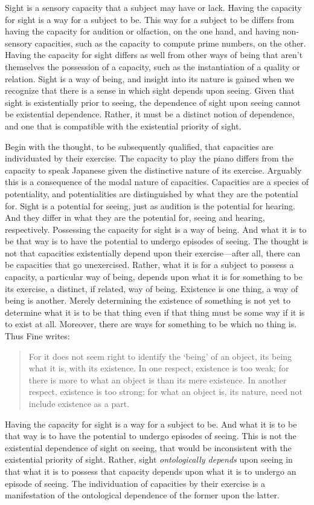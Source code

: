 \documentclass[12pt]{article}
\begin{document}
Sight is a sensory capacity that a subject may have or lack. Having the capacity for sight is a way for a subject to be. This way for a subject to be differs from having the capacity for audition or olfaction, on the one hand, and having non-sensory capacities, such as the capacity to compute prime numbers, on the other. Having the capacity for sight differs as well from other ways of being that aren't themselves the possession of a capacity, such as the instantiation of a quality or relation. Sight is a way of being, and insight into its nature is gained when we recognize that there is a sense in which sight depends upon seeing. Given that sight is existentially prior to seeing, the dependence of sight upon seeing cannot be existential dependence. Rather, it must be a distinct notion of dependence, and one that is compatible with the existential priority of sight.

Begin with the thought, to be subsequently qualified, that capacities are individuated by their exercise. The capacity to play the piano differs from the capacity to speak Japanese given the distinctive nature of its exercise. Arguably this is a consequence of the modal nature of capacities. Capacities are a species of potentiality, and potentialities are distinguished by what they are the potential for. Sight is a potential for seeing, just as audition is the potential for hearing. And they differ in what they are the potential for, seeing and hearing, respectively. Possessing the capacity for sight is a way of being. And what it is to be that way is to have the potential to undergo episodes of seeing. The thought is not that capacities existentially depend upon their exercise---after all, there can be capacities that go unexercised. Rather, what it is for a subject to possess a capacity, a particular way of being, depends upon what it is for something to be its exercise, a distinct, if related, way of being. Existence is one thing, a way of being is another. Merely determining the existence of something is not yet to determine what it is to be that thing even if that thing must be some way if it is to exist at all. Moreover, there are ways for something to be which no thing is. Thus Fine writes:
\begin{quote}
	For it does not seem right to identify the `being' of an object, its being what it is, with its existence. In one respect, existence is too weak; for there is more to what an object is than its mere existence. In another respect, existence is too strong; for what an object is, its nature, need not include existence as a part. \citep[274]{Fine:1995ls}
\end{quote}
Having the capacity for sight is a way for a subject to be. And what it is to be that way is to have the potential to undergo episodes of seeing. This is not the existential dependence of sight on seeing, that would be inconsistent with the existential priority of sight. Rather, sight \emph{ontologically depends} upon seeing in that what it is to possess that capacity depends upon what it is to undergo an episode of seeing. The individuation of capacities by their exercise is a manifestation of the ontological dependence of the former upon the latter.
\end{document}

